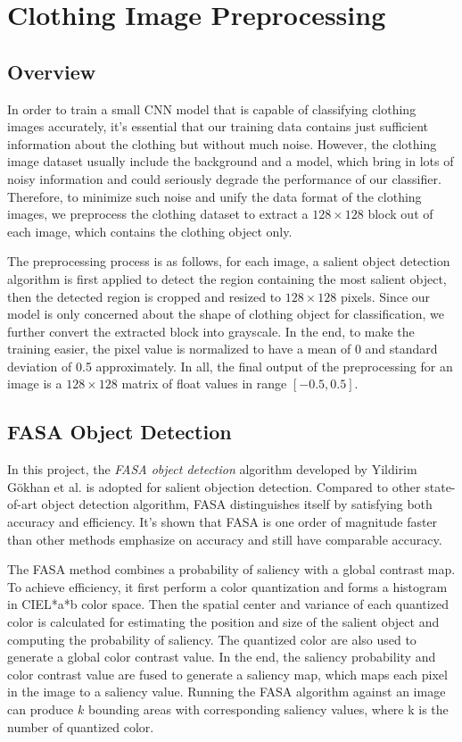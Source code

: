 \section{Clothing Image Preprocessing}

\subsection{Overview}
In order to train a small CNN model that is capable of classifying clothing images accurately, it's essential that our training data contains just sufficient information about the clothing but without much noise. However, the clothing image dataset usually include the background and a model, which bring in lots of noisy information and could seriously degrade the performance of our classifier. Therefore, to minimize such noise and unify the data format of the clothing images, we preprocess the clothing dataset to extract a $128 \times 128$ block out of each image, which contains the clothing object only.

The preprocessing process is as follows, for each image, a salient object detection algorithm is first applied to detect the region containing the most salient object, then the detected region is cropped and resized to $128 \times 128$ pixels. Since our model is only concerned about the shape of clothing object for classification, we further convert the extracted block into grayscale. In the end, to make the training easier, the pixel value is normalized to have a mean of 0 and standard deviation of 0.5 approximately. In all, the final output of the preprocessing for an image is a $128 \times 128$ matrix of float values in range $[-0.5,  0.5]$.

\subsection{FASA Object Detection}
In this project, the \emph{FASA object detection} algorithm developed by Yildirim G{\"o}khan et al. \cite{yildirim2014fasa} is adopted for salient objection detection. Compared to other state-of-art object detection algorithm, FASA distinguishes itself by satisfying both accuracy and efficiency. It's shown that FASA is one order of magnitude faster than other methods emphasize on accuracy and still have comparable accuracy.

The FASA method combines a probability of saliency with a global contrast map. To achieve efficiency, it first perform a color quantization and forms a histogram in CIEL*a*b color space. Then the spatial center and variance of each quantized color is calculated for estimating the position and size of the salient object and computing the probability of saliency. The quantized color are also used to generate a global color contrast value. In the end, the saliency probability and color contrast value are fused to generate a saliency map, which maps each pixel in the image to a saliency value. Running the FASA algorithm against an image can produce $k$ bounding areas with corresponding saliency values, where k is the number of quantized color.

